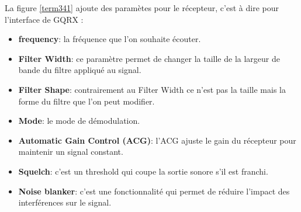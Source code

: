 \vspace{0.1cm}

La figure \ref{term341} ajoute des paramètes pour le récepteur, c'est à dire pour l'interface de GQRX :

\vspace{0.1cm}

\begin{itemize}
\item \textbf{frequency}: la fréquence que l'on souhaite écouter.
\item \textbf{Filter Width}: ce paramètre permet de changer la taille de la largeur de bande du filtre appliqué au signal.
\item \textbf{Filter Shape}: contrairement au Filter Width ce n'est pas la taille mais la forme du filtre que l'on peut modifier.
\item \textbf{Mode}: le mode de démodulation.
\item \textbf{Automatic Gain Control (ACG)}: l'ACG ajuste le gain du récepteur pour maintenir un signal constant.
\item \textbf{Squelch}: c'est un threshold qui coupe la sortie sonore s'il est franchi.
\item \textbf{Noise blanker}: c'est une fonctionnalité qui permet de réduire l'impact des interférences sur le signal.
\end{itemize}

